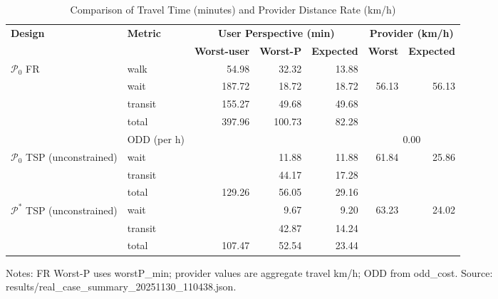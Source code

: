\begin{table}[t]
\centering
\caption{Comparison of Travel Time (minutes) and Provider Distance Rate (km/h)}
\begin{tabular}{l l r r r r r}
\toprule
\textbf{Design} & \textbf{Metric} & 
\multicolumn{3}{c}{\textbf{User Perspective (min)}} & 
\multicolumn{2}{c}{\textbf{Provider (km/h)}} \\
\cmidrule(lr){3-5}\cmidrule(lr){6-7}
& & \textbf{Worst-user} & \textbf{Worst-P} & \textbf{Expected} & \textbf{Worst} & \textbf{Expected} \\
\midrule
$\mathcal{P}_0$ FR & walk    & 54.98 & 32.32 & 13.88 &        &        \\
                   & wait    & 187.72 & 18.72 & 18.72 & 56.13  & 56.13  \\
                   & transit & 155.27 & 49.68 & 49.68 &        &        \\
                   & total   & 397.96 & 100.73 & 82.28 &       &        \\
                   & ODD (per h) &  &  &  & \multicolumn{2}{c}{0.00} \\
\midrule
$\mathcal{P}_0$ TSP (unconstrained) & wait    &  & 11.88 & 11.88 & 61.84 & 25.86 \\
                                    & transit &  & 44.17 & 17.28 &        &       \\
                                    & total   & 129.26 & 56.05 & 29.16 &        &       \\
\midrule
$\mathcal{P}^*$ TSP (unconstrained) & wait    &  & 9.67 & 9.20 & 63.23 & 24.02 \\
                                    & transit &  & 42.87 & 14.24 &        &       \\
                                    & total   & 107.47 & 52.54 & 23.44 &        &       \\
\bottomrule
\end{tabular}

\vspace{0.5ex}
\small
Notes: FR Worst-P uses worstP\_min; provider values are aggregate travel km/h; ODD from odd\_cost. Source: results/real_case_summary_20251130_110438.json.
\end{table}